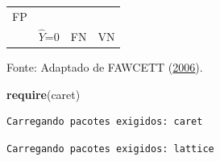\documentclass[12pt,brazil,oneside]{book}
\newenvironment{Shaded}{\begin{snugshade}}{\end{snugshade}}
\newcommand{\DataTypeTok}[1]{\textcolor[rgb]{0.13,0.29,0.53}{#1}}
\newcommand{\FloatTok}[1]{\textcolor[rgb]{0.00,0.00,0.81}{#1}}
\newcommand{\KeywordTok}[1]{\textcolor[rgb]{0.13,0.29,0.53}{\textbf{#1}}}
\newcommand{\NormalTok}[1]{#1}
\newcommand{\OperatorTok}[1]{\textcolor[rgb]{0.81,0.36,0.00}{\textbf{#1}}}
\newcommand{\StringTok}[1]{\textcolor[rgb]{0.31,0.60,0.02}{#1}}
\begin{document}
\begin{longtable}[]{@{}llll@{}}
\begin{minipage}[t]{0.12\columnwidth}
FP\strut
\end{minipage}\tabularnewline
\begin{minipage}[t]{0.25\columnwidth}\raggedright
\strut
\end{minipage} & \begin{minipage}[t]{0.15\columnwidth}\raggedright
\(\hat Y\)=0\strut
\end{minipage} & \begin{minipage}[t]{0.25\columnwidth}\raggedright
FN\strut
\end{minipage} & \begin{minipage}[t]{0.12\columnwidth}\raggedright
VN\strut
\end{minipage}\tabularnewline
\bottomrule
\end{longtable}

Fonte: Adaptado de FAWCETT (\protect\hyperlink{ref-Fawcett2006}{2006}).

\begin{Shaded}
\begin{Highlighting}[]
\KeywordTok{require}\NormalTok{(caret)}
\end{Highlighting}
\end{Shaded}

\begin{verbatim}
Carregando pacotes exigidos: caret
\end{verbatim}

\begin{verbatim}
Carregando pacotes exigidos: lattice
\end{verbatim}

\begin{Shaded}
\end{Shaded}
\end{document}
